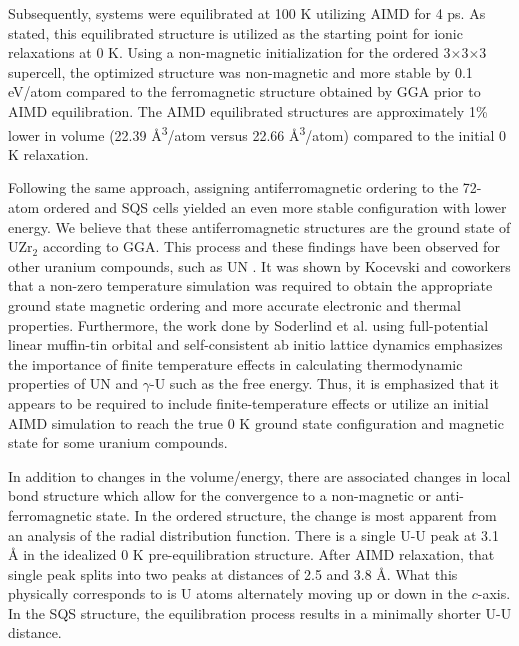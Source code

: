 \documentclass[preprint,12pt]{elsarticle}
\begin{document}
Subsequently, systems were equilibrated at 100 K utilizing AIMD for 4 ps. As stated, this equilibrated structure is utilized as the starting point for ionic relaxations at 0 K. Using a non-magnetic initialization for the ordered 3$\times$3$\times$3 supercell, the optimized structure was non-magnetic and more stable by 0.1 eV/atom compared to the ferromagnetic structure obtained by GGA prior to AIMD equilibration. The AIMD equilibrated structures are approximately 1\% lower in volume (22.39 {\AA}\textsuperscript{3}/atom versus 22.66 {\AA}\textsuperscript{3}/atom) compared to the initial 0 K relaxation. %


Following the same approach, assigning antiferromagnetic ordering to the 72-atom ordered and SQS cells yielded an even more stable configuration with lower energy. We believe that these antiferromagnetic structures are the ground state of UZr$_2$ according to GGA. This process and these findings have been observed for other uranium compounds, such as UN \cite{ kocevski_finite_2023}. It was shown by Kocevski and coworkers \cite{kocevski_finite_2023} that a non-zero temperature simulation was required to obtain the appropriate ground state magnetic ordering and more accurate electronic and thermal properties. Furthermore, the work done by Soderlind et al.\cite{soderlind_ground-state_2019, soderlind_high-temperature_2023} using full-potential linear muffin-tin orbital and self-consistent ab initio lattice dynamics emphasizes the importance of finite temperature effects in calculating thermodynamic properties of UN and $\gamma$-U such as the free energy. Thus, it is emphasized that it appears to be required to include finite-temperature effects or utilize an initial AIMD simulation to reach the true 0 K ground state configuration and magnetic state for some uranium compounds. 

In addition to changes in the volume/energy, there are associated changes in local bond structure which allow for the convergence to a non-magnetic or anti-ferromagnetic state. In the ordered structure, the change is most apparent from an analysis of the radial distribution function. There is a single U-U peak at 3.1 {\AA} in the idealized 0 K pre-equilibration structure. After AIMD relaxation, that single peak splits into two peaks at distances of 2.5 and 3.8 {\AA}. What this physically corresponds to is U atoms alternately moving up or down in the $c$-axis. In the SQS structure, the equilibration process results in a minimally shorter U-U distance.
\end{document}
